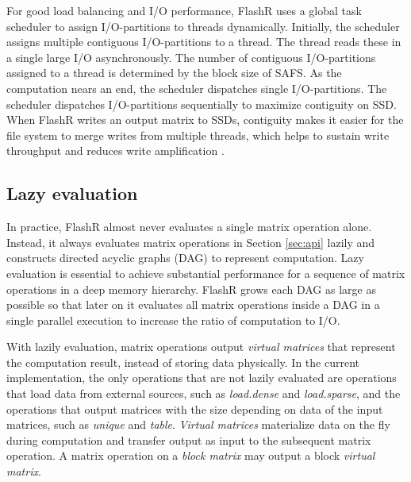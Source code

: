 For good load balancing and I/O performance, FlashR uses a global task scheduler
to assign I/O-partitions to threads dynamically. Initially, the scheduler assigns
multiple contiguous I/O-partitions to a thread. The thread reads these in
a single large I/O asynchronously. The number of contiguous I/O-partitions
assigned to a thread is determined by the block size of SAFS.
As the computation nears an end, the scheduler dispatches single I/O-partitions. 
The scheduler dispatches I/O-partitions sequentially to maximize contiguity
on SSD. When FlashR writes an output matrix to SSDs,
contiguity makes it easier for the file system to merge
writes from multiple threads, which helps to sustain write throughput and reduces
write amplification \cite{ripq}.




\subsection{Lazy evaluation}\label{sec:lazyeval}

In practice, FlashR almost never evaluates a single matrix operation alone.
Instead, it always evaluates matrix operations in Section \ref{sec:api}
lazily and constructs directed acyclic graphs (DAG) to represent computation.
Lazy evaluation is essential to achieve substantial performance for a sequence
of matrix operations in a deep memory hierarchy. FlashR grows each DAG as large
as possible so that later on it evaluates all matrix operations inside a DAG
in a single parallel execution to increase the ratio of computation to I/O.

With lazily evaluation, matrix operations
output \textit{virtual matrices} that represent the computation result,
instead of storing data physically. In the current implementation,
the only operations that are not lazily evaluated are operations that
load data from external sources, such as \textit{load.dense} and
\textit{load.sparse}, and the operations that output matrices
with the size depending on data of the input matrices, such as \textit{unique}
and \textit{table}.
\textit{Virtual matrices} materialize data on the fly during computation
and transfer output as input to the subsequent matrix operation.
A matrix operation on a \textit{block matrix} may output
a block \textit{virtual matrix}.

